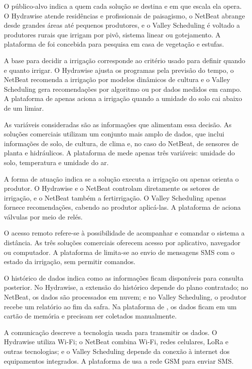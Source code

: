 O público-alvo indica a quem cada solução se destina e em que escala
ela opera. O Hydrawise atende residências e profissionais de paisagismo, o
NetBeat abrange desde grandes áreas até pequenos produtores, e o Valley
Scheduling é voltado a produtores rurais que irrigam por pivô, sistema linear ou
gotejamento. A plataforma de  foi concebida para pesquisa
em casa de vegetação e estufas.

A base para decidir a irrigação corresponde ao critério usado para
definir quando e quanto irrigar. O Hydrawise ajusta os programas pela previsão
do tempo, o NetBeat recomenda a irrigação por modelos dinâmicos de cultura e o
Valley Scheduling gera recomendações por algoritmo ou por dados medidos em
campo. A plataforma de  apenas aciona a irrigação quando
a umidade do solo cai abaixo de um limiar.

As variáveis consideradas são as informações que alimentam essa
decisão. As soluções comerciais utilizam um conjunto mais amplo de dados, que
inclui informações de solo, de cultura, de clima e, no caso do NetBeat, de
sensores de planta e hidráulicos. A plataforma de  mede apenas três variáveis: umidade do
solo, temperatura e umidade do ar.

A forma de atuação indica se a solução executa a irrigação ou apenas
orienta o produtor. O Hydrawise e o NetBeat controlam diretamente os setores de
irrigação, e o NetBeat também a fertirrigação. O Valley Scheduling apenas
fornece recomendações, cabendo ao produtor aplicá-las. A plataforma de
 aciona válvulas por meio de relés.

O acesso remoto refere-se à possibilidade de acompanhar e comandar o
sistema a distância. As três soluções comerciais oferecem acesso por aplicativo,
navegador ou computador. A plataforma de  limita-se ao
envio de mensagens SMS com o estado da irrigação, sem permitir comandos. 

O histórico de dados indica como as informações ficam disponíveis para
consulta posterior. No Hydrawise, a extensão do histórico depende do plano
contratado; no NetBeat, os dados são processados em nuvem; e no Valley
Scheduling, o produtor recebe um relatório ao fim da safra. Na plataforma de
, os dados ficam em um cartão de memória e precisam ser
coletados manualmente. 

A comunicação descreve a tecnologia usada para transmitir os dados. O
Hydrawise utiliza Wi-Fi; o NetBeat combina Wi-Fi, redes celulares, LoRa e outras
tecnologias; e o Valley Scheduling depende da conexão à internet dos
equipamentos integrados. A plataforma de  usa a rede GSM
para enviar SMS.

